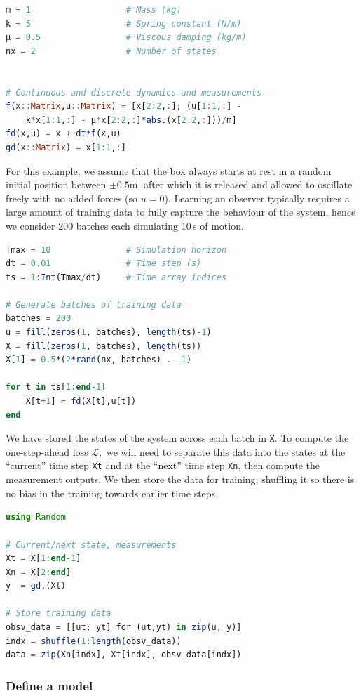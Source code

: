 \begin{lstlisting}[language = Julia]
m = 1                   # Mass (kg)
k = 5                   # Spring constant (N/m)
μ = 0.5                 # Viscous damping (kg/m)
nx = 2                  # Number of states


# Continuous and discrete dynamics and measurements
f(x::Matrix,u::Matrix) = [x[2:2,:]; (u[1:1,:] - 
    k*x[1:1,:] - μ*x[2:2,:]*abs.(x[2:2,:]))/m]
fd(x,u) = x + dt*f(x,u)
gd(x::Matrix) = x[1:1,:]
\end{lstlisting}

For this example, we assume that the box always starts at rest in a random initial position between $\pm0.5$m, after which it is released and allowed to oscillate freely with no added forces (so $u = 0$). Learning an observer typically requires a large amount of training data to fully capture the behaviour of the system, hence we consider 200 batches each simulating 10\,s of motion.
\begin{lstlisting}[language = Julia]
Tmax = 10               # Simulation horizon
dt = 0.01               # Time step (s)
ts = 1:Int(Tmax/dt)     # Time array indices

# Generate batches of training data
batches = 200
u = fill(zeros(1, batches), length(ts)-1)
X = fill(zeros(1, batches), length(ts))
X[1] = 0.5*(2*rand(nx, batches) .- 1)

for t in ts[1:end-1]
    X[t+1] = fd(X[t],u[t])
end
\end{lstlisting}
We have stored the states of the system across each batch in \verb|X|. To compute the one-step-ahead loss $\mathcal{L},$ we will need to separate this data into the states at the ``current'' time step \verb|Xt| and at the ``next'' time step \verb|Xn|, then compute the measurement outputs. We then store the data for training, shuffling it so there is no bias in the training towards earlier time steps.
\begin{lstlisting}[language = Julia]
using Random

# Current/next state, measurements
Xt = X[1:end-1]
Xn = X[2:end]
y  = gd.(Xt)

# Store training data
obsv_data = [[ut; yt] for (ut,yt) in zip(u, y)]
indx = shuffle(1:length(obsv_data))
data = zip(Xn[indx], Xt[indx], obsv_data[indx])
\end{lstlisting}

\subsubsection{Define a model} \label{sec:observer-model}

